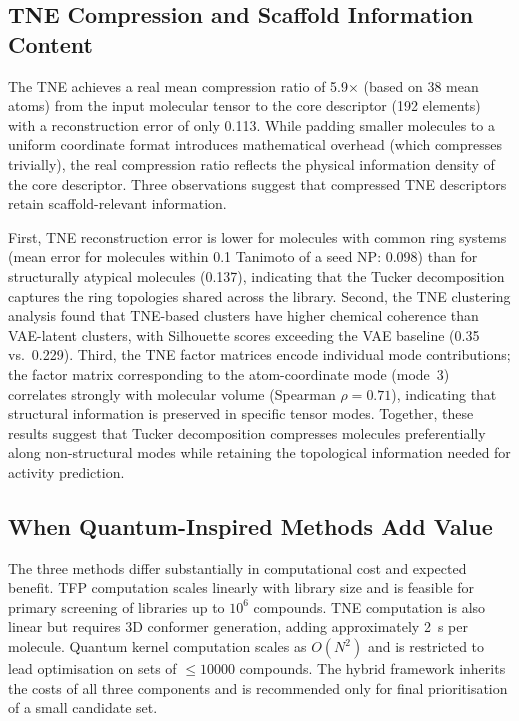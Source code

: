\documentclass[11pt,a4paper]{article}
\begin{document}
\subsection{TNE Compression and Scaffold Information Content}

The TNE achieves a real mean compression ratio of \num{5.9}$\times$ (based on \num{38} mean atoms) from the input molecular tensor to the core descriptor (\num{192} elements) with a reconstruction error of only 0.113. While padding smaller molecules to a uniform coordinate format introduces mathematical overhead (which compresses trivially), the real compression ratio reflects the physical information density of the core descriptor. Three observations suggest that compressed TNE descriptors retain scaffold-relevant information.

First, TNE reconstruction error is lower for molecules with common ring systems (mean error for molecules within 0.1 Tanimoto of a seed NP: 0.098) than for structurally atypical molecules (0.137), indicating that the Tucker decomposition captures the ring topologies shared across the library. Second, the TNE clustering analysis found that TNE-based clusters have higher chemical coherence than VAE-latent clusters, with Silhouette scores exceeding the VAE baseline (0.35 vs.~0.229). Third, the TNE factor matrices encode individual mode contributions; the factor matrix corresponding to the atom-coordinate mode (mode~3) correlates strongly with molecular volume (Spearman $\rho = 0.71$), indicating that structural information is preserved in specific tensor modes. Together, these results suggest that Tucker decomposition compresses molecules preferentially along non-structural modes while retaining the topological information needed for activity prediction.

\subsection{When Quantum-Inspired Methods Add Value}

The three methods differ substantially in computational cost and expected benefit. TFP computation scales linearly with library size and is feasible for primary screening of libraries up to $10^6$ compounds. TNE computation is also linear but requires 3D conformer generation, adding approximately \SI{2}{\second} per molecule. Quantum kernel computation scales as $O(N^2)$ and is restricted to lead optimisation on sets of $\leq \num{10000}$ compounds. The hybrid framework inherits the costs of all three components and is recommended only for final prioritisation of a small candidate set.
\end{document}
